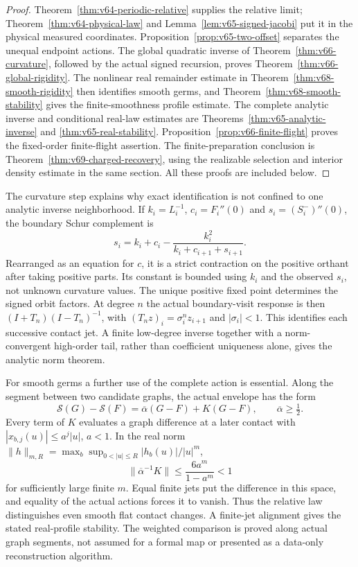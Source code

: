\begin{proof}
Theorem~\ref{thm:v64-periodic-relative} supplies the relative limit;
Theorem~\ref{thm:v64-physical-law} and
Lemma~\ref{lem:v65-signed-jacobi} put it in the physical measured
coordinates.  Proposition~\ref{prop:v65-two-offset} separates the
unequal endpoint actions.  The global quadratic inverse of
Theorem~\ref{thm:v66-curvature}, followed by the actual signed recursion,
proves Theorem~\ref{thm:v66-global-rigidity}.  The nonlinear real
remainder estimate in Theorem~\ref{thm:v68-smooth-rigidity} then
identifies smooth germs, and Theorem~\ref{thm:v68-smooth-stability}
gives the finite-smoothness profile estimate.  The complete analytic
inverse and conditional real-law estimates are
Theorems~\ref{thm:v65-analytic-inverse} and
\ref{thm:v65-real-stability}.  Proposition~\ref{prop:v66-finite-flight}
proves the fixed-order finite-flight assertion.  The finite-preparation
conclusion is Theorem~\ref{thm:v69-charged-recovery}, using the
realizable selection and interior density estimate in the same section.
All these proofs are included below.
\end{proof}

The curvature step explains why exact identification is not confined to
one analytic inverse neighborhood.  If $k_i=L_i^{-1}$,
$c_i=F_i''(0)$ and $s_i=(S_i^-)''(0)$, the boundary Schur complement is
\[
 s_i=k_i+c_i-\frac{k_i^2}{k_i+c_{i+1}+s_{i+1}}.
\]
Rearranged as an equation for $c$, it is a strict contraction on the
positive orthant after taking positive parts.  Its constant is bounded
using $k_i$ and the observed $s_i$, not unknown curvature values.
The unique positive fixed point determines the signed orbit factors.
At degree $n$ the actual boundary-visit response is then
$(I+T_n)(I-T_n)^{-1}$, with
$(T_n z)_i=\sigma_i^n z_{i+1}$ and $|\sigma_i|<1$.
This identifies each successive contact jet.  A finite low-degree
inverse together with a norm-convergent high-order tail, rather than
coefficient uniqueness alone, gives the analytic norm theorem.

For smooth germs a further use of the complete action is essential.
Along the segment between two candidate graphs, the actual envelope has
the form
\[
 \mathcal S(G)-\mathcal S(F)=\overline\alpha(G-F)+K(G-F),
 \qquad \overline\alpha\ge\tfrac12.
\]
Every term of $K$ evaluates a graph difference at a later contact with
$|x_{b,j}(u)|\le a^j|u|$, $a<1$.  In the real norm
$\|h\|_{m,R}=\max_b\sup_{0<|u|\le R}|h_b(u)|/|u|^m$,
\[
 \|\overline\alpha^{-1}K\|\le\frac{6a^m}{1-a^m}<1
\]
for sufficiently large finite $m$.  Equal finite jets put the difference
in this space, and equality of the actual actions forces it to vanish.
Thus the relative law distinguishes even smooth flat contact changes.
A finite-jet alignment gives the stated real-profile stability.  The
weighted comparison is proved along actual graph segments, not assumed
for a formal map or presented as a data-only reconstruction algorithm.

